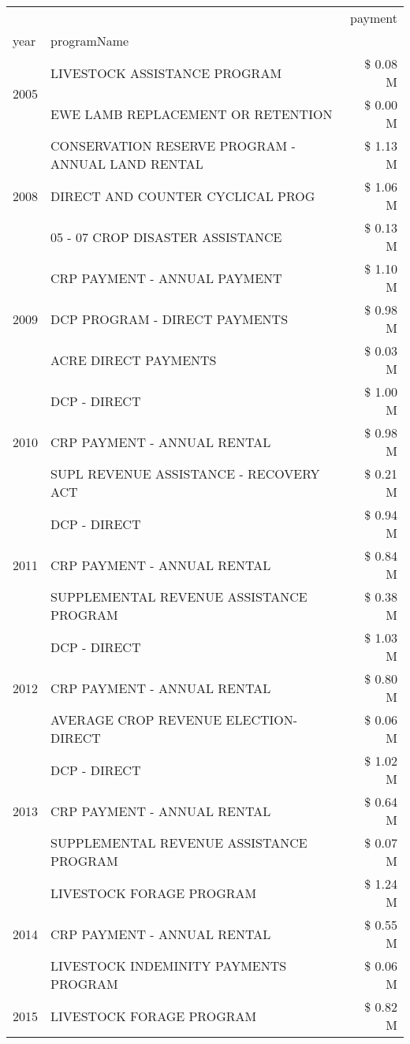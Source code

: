 \begin{tabular}{llr}
\toprule
 &  & payment \\
year & programName &  \\
\midrule
\multirow[t]{2}{*}{2005} & LIVESTOCK ASSISTANCE PROGRAM & \$ 0.08 M \\
 & EWE LAMB REPLACEMENT OR RETENTION & \$ 0.00 M \\
\cline{1-3}
\multirow[t]{3}{*}{2008} & CONSERVATION RESERVE PROGRAM - ANNUAL LAND RENTAL & \$ 1.13 M \\
 & DIRECT AND COUNTER CYCLICAL PROG & \$ 1.06 M \\
 & 05 - 07 CROP DISASTER ASSISTANCE & \$ 0.13 M \\
\cline{1-3}
\multirow[t]{3}{*}{2009} & CRP PAYMENT - ANNUAL PAYMENT & \$ 1.10 M \\
 & DCP PROGRAM - DIRECT PAYMENTS & \$ 0.98 M \\
 & ACRE DIRECT PAYMENTS & \$ 0.03 M \\
\cline{1-3}
\multirow[t]{3}{*}{2010} & DCP - DIRECT & \$ 1.00 M \\
 & CRP PAYMENT - ANNUAL RENTAL & \$ 0.98 M \\
 & SUPL REVENUE ASSISTANCE - RECOVERY ACT & \$ 0.21 M \\
\cline{1-3}
\multirow[t]{3}{*}{2011} & DCP - DIRECT & \$ 0.94 M \\
 & CRP PAYMENT - ANNUAL RENTAL & \$ 0.84 M \\
 & SUPPLEMENTAL REVENUE ASSISTANCE PROGRAM & \$ 0.38 M \\
\cline{1-3}
\multirow[t]{3}{*}{2012} & DCP - DIRECT & \$ 1.03 M \\
 & CRP PAYMENT - ANNUAL RENTAL & \$ 0.80 M \\
 & AVERAGE CROP REVENUE ELECTION-DIRECT & \$ 0.06 M \\
\cline{1-3}
\multirow[t]{3}{*}{2013} & DCP - DIRECT & \$ 1.02 M \\
 & CRP PAYMENT - ANNUAL RENTAL & \$ 0.64 M \\
 & SUPPLEMENTAL REVENUE ASSISTANCE PROGRAM & \$ 0.07 M \\
\cline{1-3}
\multirow[t]{3}{*}{2014} & LIVESTOCK FORAGE PROGRAM & \$ 1.24 M \\
 & CRP PAYMENT - ANNUAL RENTAL & \$ 0.55 M \\
 & LIVESTOCK INDEMINITY PAYMENTS PROGRAM & \$ 0.06 M \\
\cline{1-3}
\multirow[t]{3}{*}{2015} & LIVESTOCK FORAGE PROGRAM & \$ 0.82 M \\

\end{tabular}
